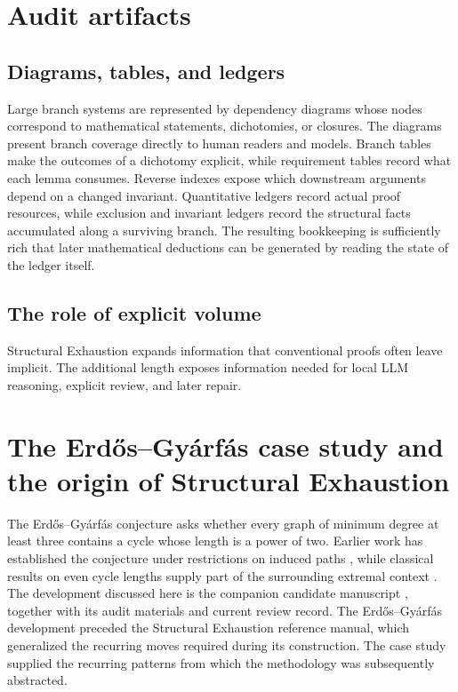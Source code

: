 \documentclass[11pt]{article}
\begin{document}
\section{Audit artifacts}
\subsection{Diagrams, tables, and ledgers}
Large branch systems are represented by dependency diagrams whose nodes correspond to mathematical statements, dichotomies, or closures.
The diagrams present branch coverage directly to human readers and models.
Branch tables make the outcomes of a dichotomy explicit, while requirement tables record what each lemma consumes.
Reverse indexes expose which downstream arguments depend on a changed invariant.
Quantitative ledgers record actual proof resources, while exclusion and invariant ledgers record the structural facts accumulated along a surviving branch.
The resulting bookkeeping is sufficiently rich that later mathematical deductions can be generated by reading the state of the ledger itself.
\subsection{The role of explicit volume}
Structural Exhaustion expands information that conventional proofs often leave implicit.
The additional length exposes information needed for local LLM reasoning, explicit review, and later repair.
\section{The Erdős–Gyárfás case study and the origin of Structural Exhaustion}
The Erdős–Gyárfás conjecture asks whether every graph of minimum degree at
least three contains a cycle whose length is a power of two. Earlier work has
established the conjecture under restrictions on induced paths
\citep{gao-shan-2021-p8,hu-shen-2023-p10,hegde-etal-2024-p13}, while classical
results on even cycle lengths supply part of the surrounding extremal context
\citep{bondy-simonovits-1974-even-cycles,sudakov-verstraete-2008-cycle-lengths}.
The development discussed here is the companion candidate manuscript
\citep{duran-ballester-2026-eg-candidate}, together with its audit materials
and current review record.
The Erdős–Gyárfás development preceded the Structural Exhaustion reference manual, which generalized the recurring moves required during its construction.
The case study supplied the recurring patterns from which the methodology was subsequently abstracted.
\end{document}

